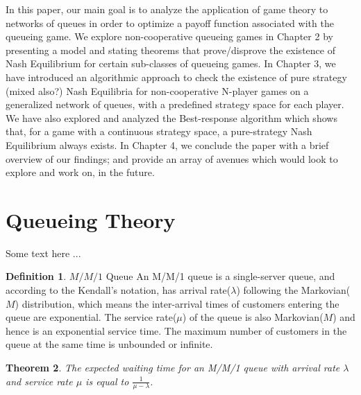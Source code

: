 \documentclass[12pt,a4paper]{report}
\theoremstyle{plain}
\newtheorem{theorem}{Theorem}[section]
\theoremstyle{definition}
\newtheorem{definition}[theorem]{Definition}
\theoremstyle{remark}
\begin{document}
In this paper, our main goal is to analyze the application of game theory to networks of queues in order to optimize a payoff function associated with the queueing game. We explore non-cooperative queueing games in Chapter 2 by presenting a model and stating theorems that prove/disprove the existence of Nash Equilibrium for certain sub-classes of queueing games.
In Chapter 3, we have introduced an algorithmic approach to check the existence of pure strategy (mixed also?) Nash Equilibria for non-cooperative N-player games on a generalized network of queues, with a predefined strategy space for each player. We have also explored and analyzed the Best-response algorithm which shows that, for a game with a continuous strategy space, a pure-strategy Nash Equilibrium always exists.
In Chapter 4, we conclude the paper with a brief overview of our findings; and provide an array of avenues which would look to explore and work on, in the future.



\section{Queueing Theory}

Some text here ...

\begin{definition}\label{abc1}
$M/M/1$ Queue
	An M/M/1 queue is a single-server queue, and according to the Kendall's notation, has arrival rate($\lambda$) following the Markovian($M$) distribution, which means the inter-arrival times of customers entering the queue are exponential. The service rate($\mu$) of the queue	is also Markovian($M$) and hence is an exponential service time. The maximum number of customers in the queue at the same time is unbounded or infinite.
\end{definition}
\vspace{2mm}
\begin{theorem}
The expected waiting time for an M/M/1 queue with arrival rate $\lambda$ and service rate $\mu$ is equal to $\frac{1}{\mu - \lambda}$.
\end{theorem}
\end{document}
